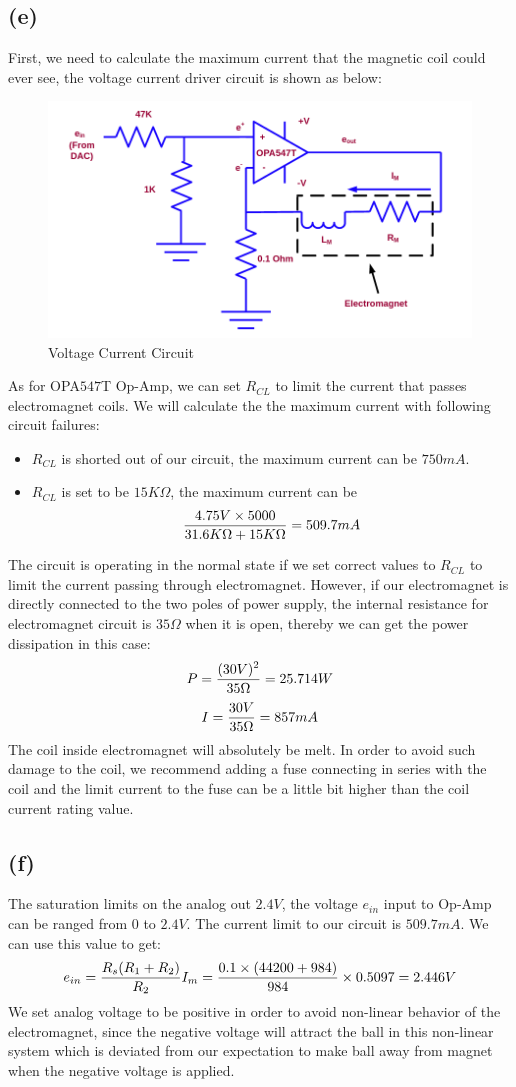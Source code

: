 \documentclass[letterpaper]{article}
\begin{document}
\subsection*{(e)}
First, we need to calculate the maximum current that the magnetic coil could ever see, the voltage current driver circuit is shown as below:
\begin{figure}[H]
	\centering
	\includegraphics[scale=0.4]{current_driver_circuit.png}
	\caption{Voltage Current Circuit}
	\label{fig:vcc}
\end{figure}
As for OPA$547$T Op-Amp, we can set $R_{CL}$ to limit the current that passes electromagnet coils. We will calculate the the maximum current with following circuit failures:
\begin{itemize}
	\item $R_{CL}$ is shorted out of our circuit, the maximum current can be $750mA$.
	\item $R_{CL}$ is set to be $15K\Omega$, the maximum current can be $$\frac{\displaystyle 4.75V\times 5000}{\displaystyle 31.6K\Omega + 15K\Omega} = 509.7mA$$
\end{itemize}
The circuit is operating in the normal state if we set correct values to $R_{CL}$ to limit the current passing through electromagnet. However, if our electromagnet is directly connected to the two poles of power supply, the internal resistance for electromagnet circuit is $35\Omega$ when it is open, thereby we can get the power dissipation in this case:
$$P = \frac{\displaystyle (30V)^2}{\displaystyle 35\Omega} = 25.714W$$
$$I = \frac{\displaystyle 30V}{\displaystyle 35\Omega} = 857mA$$
The coil inside electromagnet will absolutely be melt. In order to avoid such damage to the coil, we recommend adding a fuse connecting in series with the coil and the limit current to the fuse can be a little bit higher than the coil current rating value.
\subsection*{(f)}
The saturation limits on the analog out $2.4V$, the voltage $e_{in}$ input to Op-Amp can be ranged from $0$ to $2.4V$. The current limit to our circuit is $509.7mA$. We can use this value to get:
$$e_{in} = \frac{\displaystyle R_s(R_1 + R_2)}{\displaystyle R_2}I_m = \frac{\displaystyle 0.1\times (44200 + 984)}{\displaystyle 984}\times 0.5097 = 2.446V$$
We set analog voltage to be positive in order to avoid non-linear behavior of the electromagnet, since the negative voltage will attract the ball in this non-linear system which is deviated from our expectation to make ball away from magnet when the negative voltage is applied.
\end{document}
